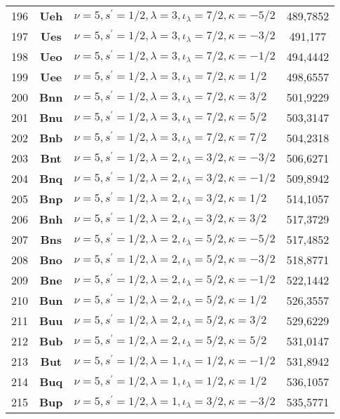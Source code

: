 \begin{center}
{\begin{tabular}{|c|c|l|c|}
196 & \textbf{Ueh}& $\nu=5,s^\prime=1/2,\lambda=3,\iota_\lambda=7/2,\kappa=-5/2$ &  489,7852\\
197 & \textbf{Ues}& $\nu=5,s^\prime=1/2,\lambda=3,\iota_\lambda=7/2,\kappa=-3/2$ &  491,177\\
198 & \textbf{Ueo}& $\nu=5,s^\prime=1/2,\lambda=3,\iota_\lambda=7/2,\kappa=-1/2$ &  494,4442\\
199 & \textbf{Uee}& $\nu=5,s^\prime=1/2,\lambda=3,\iota_\lambda=7/2,\kappa=1/2$ &  498,6557\\
200 & \textbf{Bnn}& $\nu=5,s^\prime=1/2,\lambda=3,\iota_\lambda=7/2,\kappa=3/2$ &  501,9229\\
201 & \textbf{Bnu}& $\nu=5,s^\prime=1/2,\lambda=3,\iota_\lambda=7/2,\kappa=5/2$ &  503,3147\\
202 & \textbf{Bnb}& $\nu=5,s^\prime=1/2,\lambda=3,\iota_\lambda=7/2,\kappa=7/2$ &  504,2318\\
\hline
203 & \textbf{Bnt}& $\nu=5,s^\prime=1/2,\lambda=2,\iota_\lambda=3/2,\kappa=-3/2$ &  506,6271\\
204 & \textbf{Bnq}& $\nu=5,s^\prime=1/2,\lambda=2,\iota_\lambda=3/2,\kappa=-1/2$ &  509,8942\\
205 & \textbf{Bnp}& $\nu=5,s^\prime=1/2,\lambda=2,\iota_\lambda=3/2,\kappa=1/2$ &  514,1057\\
206 & \textbf{Bnh}& $\nu=5,s^\prime=1/2,\lambda=2,\iota_\lambda=3/2,\kappa=3/2$ &  517,3729\\
\hline
207 & \textbf{Bns}& $\nu=5,s^\prime=1/2,\lambda=2,\iota_\lambda=5/2,\kappa=-5/2$ &  517,4852\\
208 & \textbf{Bno}& $\nu=5,s^\prime=1/2,\lambda=2,\iota_\lambda=5/2,\kappa=-3/2$ &  518,8771\\
209 & \textbf{Bne}& $\nu=5,s^\prime=1/2,\lambda=2,\iota_\lambda=5/2,\kappa=-1/2$ &  522,1442\\
210 & \textbf{Bun}& $\nu=5,s^\prime=1/2,\lambda=2,\iota_\lambda=5/2,\kappa=1/2$ &  526,3557\\
211 & \textbf{Buu}& $\nu=5,s^\prime=1/2,\lambda=2,\iota_\lambda=5/2,\kappa=3/2$ &  529,6229\\
212 & \textbf{Bub}& $\nu=5,s^\prime=1/2,\lambda=2,\iota_\lambda=5/2,\kappa=5/2$ &  531,0147\\
\hline
213 & \textbf{But}& $\nu=5,s^\prime=1/2,\lambda=1,\iota_\lambda=1/2,\kappa=-1/2$ &  531,8942\\
214 & \textbf{Buq}& $\nu=5,s^\prime=1/2,\lambda=1,\iota_\lambda=1/2,\kappa=1/2$ &  536,1057\\
\hline
215 & \textbf{Bup}& $\nu=5,s^\prime=1/2,\lambda=1,\iota_\lambda=3/2,\kappa=-3/2$ &  535,5771\\

\end{tabular}}
\end{center}
